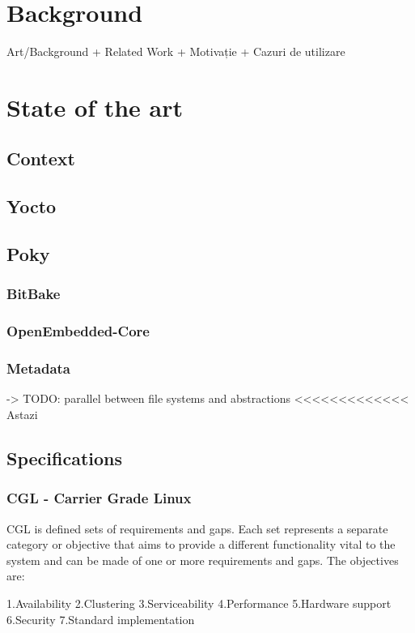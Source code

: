 \documentclass{article}
\begin{document}
	\section{Background}

	Art/Background + Related Work + Motivație + Cazuri de utilizare
	\section{State of the art}

	\subsection{Context}
	\subsection{Yocto}

	\subsection{Poky}
		\subsubsection{BitBake}
		\subsubsection{OpenEmbedded-Core}
		\subsubsection{Metadata}
			-> TODO: parallel between file systems and abstractions <<<<<<<<<<<<< Astazi

	\subsection{Specifications}
		\subsubsection{CGL - Carrier Grade Linux}
			CGL is defined sets of requirements and gaps. Each set represents a separate category or objective that aims to provide a different functionality vital to the system and can be made of one or more requirements and gaps. The objectives are:

			1.Availability
			2.Clustering
			3.Serviceability
			4.Performance
			5.Hardware support
			6.Security
			7.Standard implementation
\end{document}
